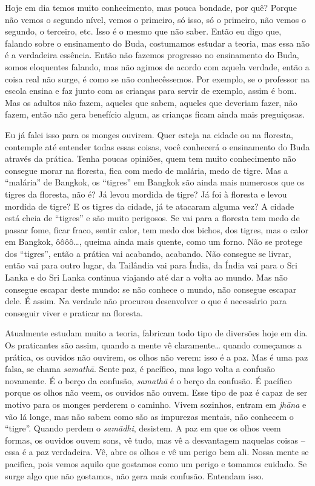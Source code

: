 Hoje em dia temos muito conhecimento, mas pouca bondade, por quê?
Porque não vemos o segundo nível, vemos o primeiro, só isso, só o
primeiro, não vemos o segundo, o terceiro, etc. Isso é o mesmo que não
saber. Então eu digo que, falando sobre o ensinamento do Buda,
costumamos estudar a teoria, mas essa não é a verdadeira essência.
Então não fazemos progresso no ensinamento do Buda, somos eloquentes
falando, mas não agimos de acordo com aquela verdade, então a coisa
real não surge, é como se não conhecêssemos. Por exemplo, se o
professor na escola ensina e faz junto com as crianças para servir de
exemplo, assim é bom. Mas os adultos não fazem, aqueles que sabem,
aqueles que deveriam fazer, não fazem, então não gera benefício algum,
as crianças ficam ainda mais preguiçosas. 

Eu já falei isso para os monges ouvirem. Quer esteja na cidade ou na
floresta, contemple até entender todas essas coisas, você conhecerá o
ensinamento do Buda através da prática. Tenha poucas opiniões, quem tem
muito conhecimento não consegue morar na floresta, fica com medo de
malária, medo de tigre. Mas a “malária” de Bangkok, os “tigres” em
Bangkok são ainda mais numerosos que os tigres da floresta, não é? Já
levou mordida de tigre? Já foi à floresta e levou mordida de tigre? E
os tigres da cidade, já te atacaram alguma vez? A cidade está cheia de
“tigres” e são muito perigosos. Se vai para a floresta tem medo de
passar fome, ficar fraco, sentir calor, tem medo dos bichos, dos
tigres, mas o calor em Bangkok, ôôôô…, queima ainda mais quente, como
um forno. Não se protege dos “tigres”, então a prática vai acabando,
acabando. Não consegue se livrar, então vai para outro lugar, da
Tailândia vai para Índia, da Índia vai para o Sri Lanka e do Sri Lanka
continua viajando até dar a volta ao mundo. Mas não consegue escapar
deste mundo: se não conhece o mundo, não consegue escapar dele. É
assim. Na verdade não procurou desenvolver o que é necessário para
conseguir viver e praticar na floresta.

Atualmente estudam muito a teoria, fabricam todo tipo de diversões
hoje em dia. Os praticantes são assim, quando a mente vê claramente…
quando começamos a prática, os ouvidos não ouvirem, os olhos não verem:
isso é a paz. Mas é uma paz falsa, se chama \textit{samathā}. Sente
paz, é pacífico, mas logo volta a confusão novamente. É o berço da
confusão, \textit{samathā} é o berço da confusão. É pacífico porque
os olhos não veem, os ouvidos não ouvem. Esse tipo de paz é capaz de
ser motivo para os monges perderem o caminho. Vivem sozinhos, entram em
\textit{jhāna} e vão lá longe, mas não sabem como são as impurezas
mentais, não conhecem o “tigre”. Quando perdem o \textit{samādhi},
desistem. A paz em que os olhos veem formas, os ouvidos ouvem sons, vê
tudo, mas vê a desvantagem naquelas coisas – essa é a paz verdadeira.
Vê, abre os olhos e vê um perigo bem ali. Nossa mente se pacifica, pois
vemos aquilo que gostamos como um perigo e tomamos cuidado. Se surge
algo que não gostamos, não gera mais confusão. Entendam isso. 

